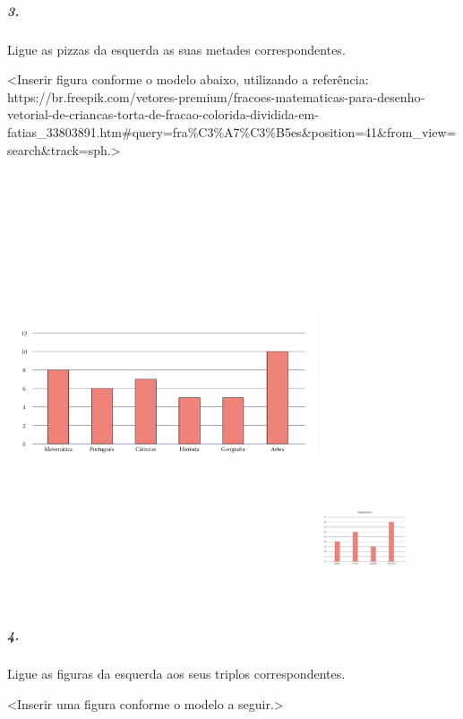 \subparagraph{3.}\label{section-91}

Ligue as pizzas da esquerda as suas metades correspondentes.

\textless{}Inserir figura conforme o modelo abaixo, utilizando a
referência:
https://br.freepik.com/vetores-premium/fracoes-matematicas-para-desenho-vetorial-de-criancas-torta-de-fracao-colorida-dividida-em-fatias\_33803891.htm\#query=fra\%C3\%A7\%C3\%B5es\&position=41\&from\_view=search\&track=sph.\textgreater{}

\includegraphics[width=3.60298in,height=5.04167in]{media/image100.png}\includegraphics[width=1.10824in,height=1.56250in]{media/image101.png}

\subparagraph{4.}\label{section-92}

Ligue as figuras da esquerda aos seus triplos correspondentes.

\textless{}Inserir uma figura conforme o modelo a seguir.\textgreater{}

